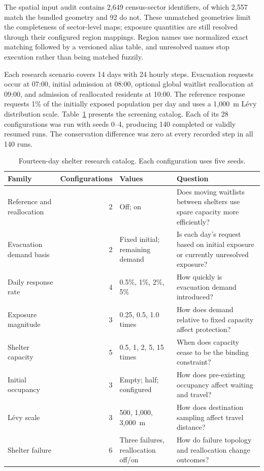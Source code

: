 The spatial input audit contains 2,649 census-sector identifiers, of which 2,557 match the bundled geometry and 92 do not. These unmatched geometries limit the completeness of sector-level maps; exposure quantities are still resolved through their configured region mappings. Region names use normalized exact matching followed by a versioned alias table, and unresolved names stop execution rather than being matched fuzzily.

Each research scenario covers 14 days with 24 hourly steps. Evacuation requests occur at 07:00, initial admission at 08:00, optional global waitlist reallocation at 09:00, and admission of reallocated residents at 10:00. The reference response requests 1\% of the initially exposed population per day and uses a 1,000~m L\'evy distribution scale. Table~\ref{tbl:shelter_scenario_families} presents the screening catalog. Each of its 28 configurations was run with seeds 0--4, producing 140 completed or validly resumed runs. The conservation difference was zero at every recorded step in all 140 runs.

\begin{table}[ht]
\centering
\footnotesize
\caption{Fourteen-day shelter research catalog. Each configuration uses five seeds.}
\label{tbl:shelter_scenario_families}
\begin{tabularx}{\linewidth}{@{}lrlX@{}}
\toprule
\textbf{Family} & \textbf{Configurations} & \textbf{Values} & \textbf{Question} \\
\midrule
Reference and reallocation & 2 & Off; on & Does moving waitlists between shelters use spare capacity more efficiently? \\
Evacuation demand basis & 2 & Fixed initial; remaining demand & Is each day's request based on initial exposure or currently unresolved exposure? \\
Daily response rate & 4 & 0.5\%, 1\%, 2\%, 5\% & How quickly is evacuation demand introduced? \\
Exposure magnitude & 3 & 0.25, 0.5, 1.0 times & How does demand relative to fixed capacity affect protection? \\
Shelter capacity & 5 & 0.5, 1, 2, 5, 15 times & When does capacity cease to be the binding constraint? \\
Initial occupancy & 3 & Empty; half; configured & How does pre-existing occupancy affect waiting and travel? \\
L\'evy scale & 3 & 500, 1,000, 3,000~m & How does destination sampling affect travel distance? \\
Shelter failure & 6 & Three failures, reallocation off/on & How do failure topology and reallocation change outcomes? \\
\bottomrule
\end{tabularx}
\end{table}

